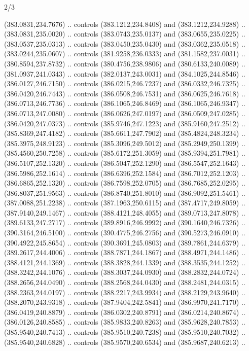 \begin{flagdescription}{2/3}
\begin{scope}[xshift=0.5\flaglength,yshift=0.5\flagwidth,scale=\flagwidth/495.65]
\begin{scope}[y=0.8pt, x=0.8pt, yscale=-1,shift={(-463.76,-309.78)}]
  (383.0831,234.7676) .. controls (383.1212,234.8408) and (383.1212,234.9288) ..
  (383.0831,235.0020) .. controls (383.0743,235.0137) and (383.0655,235.0225) ..
  (383.0537,235.0313) .. controls (383.0450,235.0430) and (383.0362,235.0518) ..
  (383.0244,235.0607) .. controls (381.9258,236.0333) and (381.1582,237.0031) ..
  (380.8594,237.8732) .. controls (380.4756,238.9806) and (380.6133,240.0089) ..
  (381.0937,241.0343) .. controls (382.0137,243.0031) and (384.1025,244.8546) ..
  (386.0127,246.7150) .. controls (386.0215,246.7237) and (386.0332,246.7325) ..
  (386.0420,246.7443) .. controls (386.0508,246.7531) and (386.0625,246.7618) ..
  (386.0713,246.7736) .. controls (386.1065,246.8469) and (386.1065,246.9347) ..
  (386.0713,247.0080) .. controls (386.0626,247.0197) and (386.0509,247.0285) ..
  (386.0420,247.0373) .. controls (385.9746,247.1223) and (385.9160,247.2512) ..
  (385.8369,247.4182) .. controls (385.6611,247.7902) and (385.4824,248.3234) ..
  (385.3975,248.9123) .. controls (385.3096,249.5012) and (385.2949,250.1399) ..
  (385.4560,250.7258) .. controls (385.6172,251.3059) and (385.9394,251.7981) ..
  (386.5107,252.1320) .. controls (386.5047,252.1290) and (386.5547,252.1643) ..
  (386.5986,252.1614) .. controls (386.6396,252.1584) and (386.7012,252.1203) ..
  (386.6865,252.1320) .. controls (386.7598,252.0705) and (386.7685,252.0295) ..
  (386.8037,251.9563) .. controls (386.8740,251.8010) and (386.9092,251.5461) ..
  (387.0088,251.2238) .. controls (387.1963,250.6115) and (387.4717,249.8059) ..
  (387.9140,249.1467) .. controls (388.4121,248.4055) and (389.0713,247.8078) ..
  (389.6133,247.2717) .. controls (389.8916,246.9992) and (390.1640,246.7326) ..
  (390.3164,246.5100) .. controls (390.4775,246.2756) and (390.5273,246.0910) ..
  (390.4922,245.8654) .. controls (390.3691,245.0803) and (389.7861,244.6379) ..
  (389.2617,244.4006) .. controls (388.7871,244.1867) and (388.4971,244.1486) ..
  (388.4121,244.1369) .. controls (388.3828,244.1339) and (388.3535,244.1252) ..
  (388.3242,244.1076) .. controls (388.3037,244.0930) and (388.2832,244.0724) ..
  (388.2656,244.0490) .. controls (388.2568,244.0430) and (388.2481,244.0315) ..
  (388.2363,244.0197) .. controls (388.2217,243.9934) and (388.2129,243.9640) ..
  (388.2070,243.9318) .. controls (387.9404,242.5841) and (386.9970,241.7170) ..
  (386.0419,240.8879) .. controls (386.0302,240.8791) and (386.0214,240.8674) ..
  (386.0126,240.8585) .. controls (385.9833,240.8263) and (385.9628,240.7853) ..
  (385.9540,240.7413) .. controls (385.9510,240.7238) and (385.9510,240.7032) ..
  (385.9540,240.6828) .. controls (385.9570,240.6534) and (385.9687,240.6213) ..

\end{scope}
\end{scope}
\end{flagdescription}

